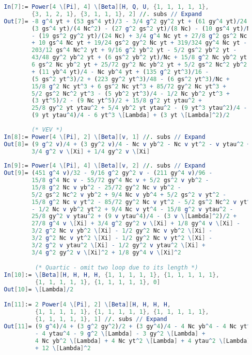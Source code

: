 \documentclass{scrartcl}
\begin{document}
\begin{lstlisting}[language=mathematica,mathescape,columns=flexible,backgroundcolor=\color{light-gray}]
In[7]:= Power[4 \[Pi], 4] \[Beta][H, Q, U, {1, 1, 1, 1, 1}, 
        {3, 1, 2, 1}, {3, 1, 1, 1}, 2] //. subs // Expand
Out[7]= -8 g^4 yt + (53 gs^4 yt)/3 - 3/4 g^2 gy^2 yt + (61 gy^4 yt)/24 - 
        (3 gs^4 yt)/(4 Nc^2) - (27 g^2 gs^2 yt)/(8 Nc) - (10 gs^4 yt)/Nc
        - (19 gs^2 gy^2 yt)/(24 Nc) + 3/4 g^4 Nc yt + 27/8 g^2 gs^2 Nc yt
        + 10 gs^4 Nc yt + 19/24 gs^2 gy^2 Nc yt + 319/324 gy^4 Nc yt - 
        203/12 gs^4 Nc^2 yt + 9/16 g^2 yb^2 yt - 5/2 gs^2 yb^2 yt - 
        43/48 gy^2 yb^2 yt + (6 gs^2 yb^2 yt)/Nc + 15/8 g^2 Nc yb^2 yt -
        6 gs^2 Nc yb^2 yt + 25/72 gy^2 Nc yb^2 yt + 5/2 gs^2 Nc^2 yb^2 yt
        + (11 yb^4 yt)/4 - Nc yb^4 yt + (135 g^2 yt^3)/16 - 
        (5 gs^2 yt^3)/2 + (223 gy^2 yt^3)/48 - (6 gs^2 yt^3)/Nc + 
        15/8 g^2 Nc yt^3 + 6 gs^2 Nc yt^3 + 85/72 gy^2 Nc yt^3 + 
        5/2 gs^2 Nc^2 yt^3 - (5 yb^2 yt^3)/4 - 1/2 Nc yb^2 yt^3 + 
        (3 yt^5)/2 - (9 Nc yt^5)/2 + 15/8 g^2 yt ytau^2 + 
        25/8 gy^2 yt ytau^2 + 5/4 yb^2 yt ytau^2 - (9 yt^3 ytau^2)/4 - 
        (9 yt ytau^4)/4 - 6 yt^3 \[Lambda] + (3 yt \[Lambda]^2)/2
        
        (* VEV *)
In[8]:= Power[4 \[Pi], 2] \[Beta][v, 1] //. subs // Expand
Out[8]= (9 g^2 v)/4 + (3 gy^2 v)/4 - Nc v yb^2 - Nc v yt^2 - v ytau^2 + 
        3/4 g^2 v \[Xi] + 1/4 gy^2 v \[Xi]
        
In[9]:= Power[4 \[Pi], 4] \[Beta][v, 2] //. subs // Expand
Out[9]= (451 g^4 v)/32 - 9/16 g^2 gy^2 v - (211 gy^4 v)/96 - 
        15/8 g^4 Nc v - 55/72 gy^4 Nc v + 5/2 gs^2 v yb^2 - 
        15/8 g^2 Nc v yb^2 - 25/72 gy^2 Nc v yb^2 - 
        5/2 gs^2 Nc^2 v yb^2 + 9/4 Nc v yb^4 + 5/2 gs^2 v yt^2 - 
        15/8 g^2 Nc v yt^2 - 85/72 gy^2 Nc v yt^2 - 5/2 gs^2 Nc^2 v yt^2 
        - 1/2 Nc v yb^2 yt^2 + 9/4 Nc v yt^4 - 15/8 g^2 v ytau^2 - 
        25/8 gy^2 v ytau^2 + (9 v ytau^4)/4 - (3 v \[Lambda]^2)/2 + 
        27/8 g^4 v \[Xi] + 3/4 g^2 gy^2 v \[Xi] + 1/8 gy^4 v \[Xi] - 
        3/2 g^2 Nc v yb^2 \[Xi] - 1/2 gy^2 Nc v yb^2 \[Xi] - 
        3/2 g^2 Nc v yt^2 \[Xi] - 1/2 gy^2 Nc v yt^2 \[Xi] - 
        3/2 g^2 v ytau^2 \[Xi] - 1/2 gy^2 v ytau^2 \[Xi] + 
        3/4 g^2 gy^2 v \[Xi]^2 + 1/8 gy^4 v \[Xi]^2

         (* Quartic - omit two loop due to its length *)
In[10]:= \[Beta][H, H, H, H, {1, 1, 1, 1, 1}, {1, 1, 1, 1, 1}, 
         {1, 1, 1, 1, 1}, {1, 1, 1, 1, 1}, 0]
Out[10]= \[Lambda]/2

In[11]:= 2 Power[4 \[Pi], 2] \[Beta][H, H, H, H, 
         {1, 1, 1, 1, 1}, {1, 1, 1, 1, 1}, {1, 1, 1, 1, 1}, 
         {1, 1, 1, 1, 1}, 1] //. subs // Expand
Out[11]= (9 g^4)/4 + (3 g^2 gy^2)/2 + (3 gy^4)/4 - 4 Nc yb^4 - 4 Nc yt^4 
         - 4 ytau^4 - 9 g^2 \[Lambda] - 3 gy^2 \[Lambda] + 
         4 Nc yb^2 \[Lambda] + 4 Nc yt^2 \[Lambda] + 4 ytau^2 \[Lambda] 
         + 12 \[Lambda]^2


\end{lstlisting}
\end{document}
